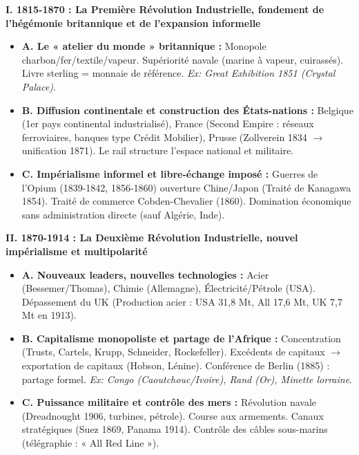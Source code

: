 \documentclass[11pt]{article}
\begin{document}
\begin{exoresolu}
\textbf{I. 1815-1870 : La Première Révolution Industrielle, fondement de l'hégémonie britannique et de l'expansion informelle}
\begin{itemize}
    \item \textbf{A. Le « atelier du monde » britannique :} Monopole charbon/fer/textile/vapeur. Supériorité navale (marine à vapeur, cuirassés). Livre sterling = monnaie de référence. \emph{Ex: Great Exhibition 1851 (Crystal Palace)}.
    \item \textbf{B. Diffusion continentale et construction des États-nations :} Belgique (1er pays continental industrialisé), France (Second Empire : réseaux ferroviaires, banques type Crédit Mobilier), Prusse (Zollverein 1834 $\rightarrow$ unification 1871). Le rail structure l'espace national et militaire.
    \item \textbf{C. Impérialisme informel et libre-échange imposé :} Guerres de l'Opium (1839-1842, 1856-1860) ouverture Chine/Japon (Traité de Kanagawa 1854). Traité de commerce Cobden-Chevalier (1860). Domination économique sans administration directe (sauf Algérie, Inde).
\end{itemize}

\textbf{II. 1870-1914 : La Deuxième Révolution Industrielle, nouvel impérialisme et multipolarité}
\begin{itemize}
    \item \textbf{A. Nouveaux leaders, nouvelles technologies :} Acier (Bessemer/Thomas), Chimie (Allemagne), Électricité/Pétrole (USA). Dépassement du UK (Production acier : USA 31,8 Mt, All 17,6 Mt, UK 7,7 Mt en 1913).
    \item \textbf{B. Capitalisme monopoliste et partage de l'Afrique :} Concentration (Trusts, Cartels, Krupp, Schneider, Rockefeller). Excédents de capitaux $\rightarrow$ exportation de capitaux (Hobson, Lénine). Conférence de Berlin (1885) : partage formel. \emph{Ex: Congo (Caoutchouc/Ivoire), Rand (Or), Minette lorraine}.
    \item \textbf{C. Puissance militaire et contrôle des mers :} Révolution navale (Dreadnought 1906, turbines, pétrole). Course aux armements. Canaux stratégiques (Suez 1869, Panama 1914). Contrôle des câbles sous-marins (télégraphie : « All Red Line »).
\end{itemize}


\end{exoresolu}
\end{document}
